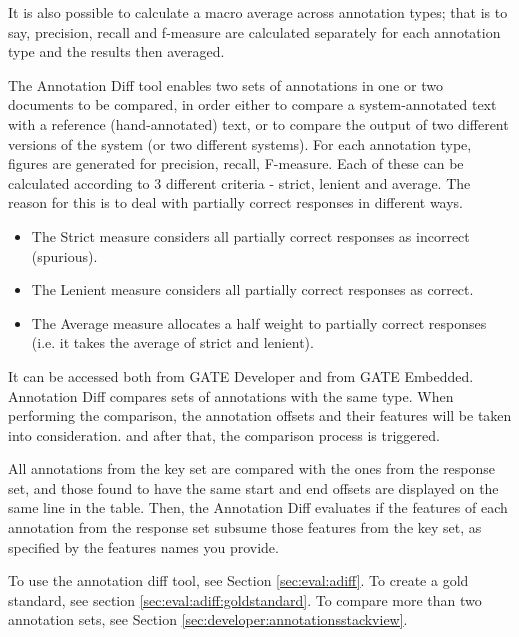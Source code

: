 It is also possible to calculate a macro average across annotation types; that
is to say, precision, recall and f-measure are calculated separately for each
annotation type and the results then averaged.


The Annotation Diff tool enables two sets of annotations in one or two
documents to be compared, in order either to compare a system-annotated
text with a reference (hand-annotated) text, or to compare the output
of two different versions of the system (or two different
systems). For each annotation type, figures are generated for
precision, recall, F-measure.
Each of these can be calculated according to 3 different
criteria - strict, lenient and average. The reason for this is to deal
with partially correct responses in different ways.
\begin{itemize}
\item The Strict measure considers all partially correct
responses as incorrect (spurious).
\item The Lenient measure considers all partially correct
responses as correct.
\item The Average measure allocates a half weight to
partially correct responses (i.e. it takes the average of strict
and lenient).
\end{itemize}

It can be accessed both from GATE Developer and from GATE Embedded.
Annotation Diff compares sets of annotations with the same type. When
performing the comparison, the annotation offsets and their features will be
taken into consideration. and after that, the comparison process is
triggered.

All annotations from the key set are compared with the ones from
the response set, and those found to have the same start and end
offsets are displayed on the same line in the table. Then, the
Annotation Diff evaluates if the features of each annotation from
the response set subsume those features from the key set, as
specified by the features names you provide.

To use the annotation diff tool, see Section \ref{sec:eval:adiff}. To create
a gold standard, see section \ref{sec:eval:adiff:goldstandard}. To compare
more than two annotation sets, see Section
\ref{sec:developer:annotationsstackview}.

